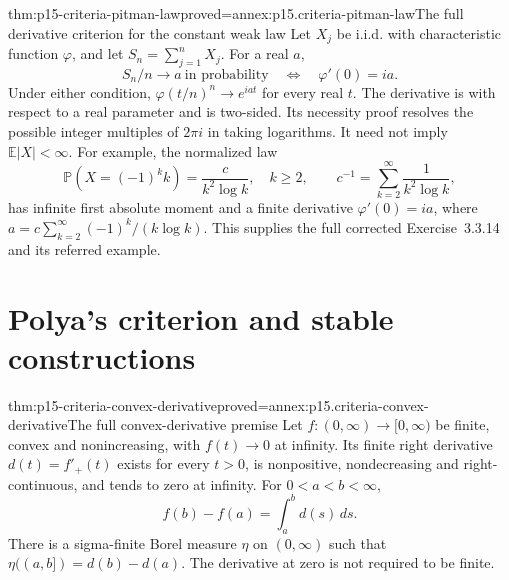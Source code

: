 \begin{hbtheorem}{thm:p15-criteria-pitman-law}{proved=annex:p15.criteria-pitman-law}{The full derivative criterion for the constant weak law}
Let \(X_j\) be i.i.d. with characteristic function \(\varphi\),
and let \(S_n=\sum_{j=1}^nX_j\).
For a real \(a\),
\[
 S_n/n\longrightarrow a\ \text{in probability}
 \quad\Longleftrightarrow\quad
 \varphi'(0)=ia.
\]
Under either condition,
\(\varphi(t/n)^n\to e^{iat}\) for every real \(t\).
The derivative is with respect to a real parameter and is
two-sided. Its necessity proof resolves the possible
integer multiples of \(2\pi i\) in taking logarithms.
It need not imply \(\mathbb E|X|<\infty\).
For example, the normalized law
\[
 \mathbb P(X=(-1)^k k)=\frac{c}{k^2\log k},\quad k\geq2,
 \qquad c^{-1}=\sum_{k=2}^\infty\frac1{k^2\log k},
\]
has infinite first absolute moment and a finite derivative
\(\varphi'(0)=ia\), where
\(a=c\sum_{k=2}^\infty(-1)^k/(k\log k)\).
This supplies the full corrected Exercise~3.3.14 and
its referred example.
\end{hbtheorem}

\section{Polya's criterion and stable constructions}
\label{sec:p15-criteria-polya}

\begin{hblemma}{thm:p15-criteria-convex-derivative}{proved=annex:p15.criteria-convex-derivative}{The full convex-derivative premise}
Let \(f:(0,\infty)\to[0,\infty)\) be finite, convex and
nonincreasing, with \(f(t)\to0\) at infinity.
Its finite right derivative \(d(t)=f'_+(t)\) exists for every
\(t>0\), is nonpositive, nondecreasing and right-continuous,
and tends to zero at infinity. For \(0<a<b<\infty\),
\[
 f(b)-f(a)=\int_a^b d(s)\,ds.
\]
There is a sigma-finite Borel measure \(\eta\) on \((0,\infty)\)
such that \(\eta((a,b])=d(b)-d(a)\).
The derivative at zero is not required to be finite.
\end{hblemma}

